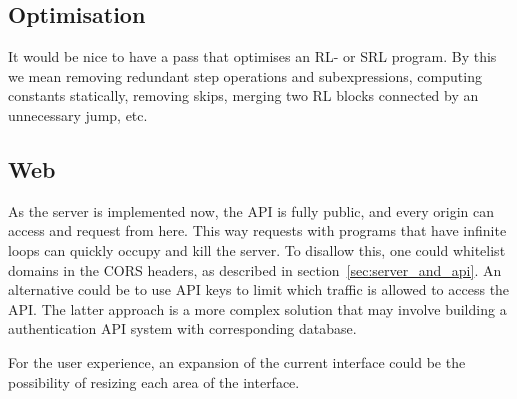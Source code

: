 \subsection{Optimisation}
It would be nice to have a pass that optimises an RL- or SRL program. By this we mean removing redundant step operations and subexpressions, computing constants statically, removing skips, merging two RL blocks connected by an unnecessary jump, etc.

\subsection{Web}
As the server is implemented now, the API is fully public, and every origin can access and request from here. This way requests with programs that have infinite loops can quickly occupy and kill the server. To disallow this, one could whitelist domains in the CORS headers, as described in section~\ref{sec:server_and_api}. An alternative could be to use API keys to limit which traffic is allowed to access the API. The latter approach is a more complex solution that may involve building a authentication API system with corresponding database.

For the user experience, an expansion of the current interface could be the possibility of resizing each area of the interface.
